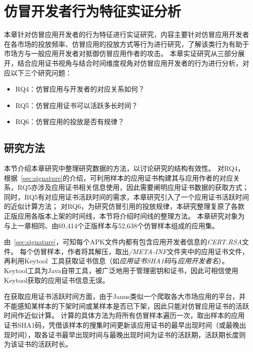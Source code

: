 \chapter{仿冒开发者行为特征实证分析}
\label{chp:discoveries_behavior}

本章针对仿冒应用开发者的行为特征进行实证研究，内容主要针对仿冒应用开发者在各市场的投放频率、仿冒应用的投放方式等行为进行研究，了解该类行为有助于市场方与一般应用开发者对抵御仿冒应用作者的攻击。
本章实证研究从三部分展开，结合应用证书视角与结合时间维度视角对仿冒应用开发者的行为进行分析，对应以下三个研究问题：

\begin{itemize}
    \item RQ4：仿冒应用与开发者的对应关系如何？
    \item RQ5：仿冒应用证书可以活跃多长时间？
    \item RQ6：仿冒应用的投放是否有规律？
\end{itemize}

\section{研究方法}

本节介绍本章研究中整理研究数据的方法，以讨论研究的结构有效性。
对RQ4，根据~\autoref{sec:signature}的介绍，可利用样本的应用证书构建其与应用作者的对应关系，RQ5亦涉及应用证书相关信息使用，因此需要阐明应用证书数据的获取方式；
同时，RQ5有对应用证书活跃时间的需求，本章研究引入了一个应用证书活跃时间的近似计算方法；
对RQ6，为研究仿冒引用的投放规律，本研究整理复原了各款正版应用各版本上架的时间线，本节将介绍时间线的整理方法。
本章研究对象为与上一章相同、由69,414个正版样本与52,638个仿冒样本组成的应用集。

由~\autoref{sec:signature}，可知每个APK文件内都有包含应用开发者信息的\textit{CERT.RSA}文件。
每个仿冒样本，作者将其解压，取出\textit{/META-INF}文件夹中的应用证书文件，再利用Keytool~\cite{keytool}工具获取证书信息（如\textit{应用证书SHA1码}与\textit{应用开发者名}）。
Keytool工具为Java自带工具，被广泛地用于管理密钥和证书，因此可相信使用Keytool获取的应用证书信息无误。

在获取应用证书活跃时间方面，由于Janus类似一个爬取各大市场应用的平台，并不能感知某样本的下架时间或某样本是否已下架，因此只能对仿冒应用证书的活跃时间作近似计算。
计算的具体方法为将所有仿冒样本遍历一次，取出样本的应用证书SHA1码，凭借该样本的搜集时间更新该应用证书的最早出现时间（或最晚出现时间），取各证书最早出现时间与最晚出现时间为证书的活跃期，活跃期长度则为该证书的活跃时长。

